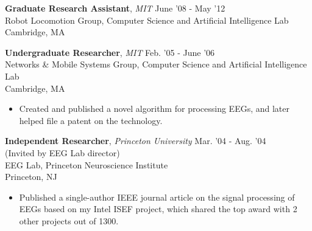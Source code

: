 \documentclass[margin]{res}
\begin{document}
\begin{resume}
 {\bf Graduate Research Assistant}, {\it MIT} \hfill June '08 - May '12 \\ Robot Locomotion Group, Computer Science and Artificial Intelligence Lab \\ Cambridge, MA 
 
% 
  {\bf Undergraduate Researcher}, {\it MIT} \hfill Feb. '05 - June '06 \\ Networks \& Mobile Systems Group, Computer Science and Artificial Intelligence Lab \\ Cambridge, MA 
 \begin{itemize} \itemsep -2pt  %
\item Created and published a novel algorithm for processing EEGs, and later helped file a patent on the technology.
\end{itemize}

\newpage

  {\bf Independent Researcher}, {\it Princeton University} \hfill Mar. '04 - Aug. '04 \\ (Invited by EEG Lab director)\\ EEG Lab, Princeton Neuroscience Institute \\ Princeton, NJ 
 \begin{itemize} \itemsep -2pt  %
\item Published a single-author IEEE journal article on the signal processing of EEGs based on my Intel ISEF project, which shared the top award with 2 other projects out of 1300. 
\end{itemize}
 

\end{resume}
\end{document}
